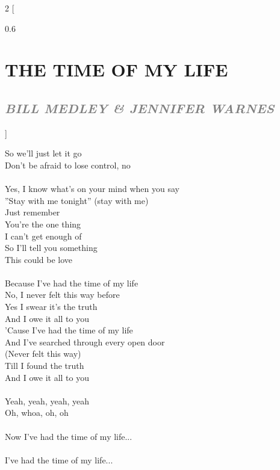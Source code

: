 \documentclass[100pt,a4paper]{report}
\newenvironment{song2}[2]
	{	
    	\begin{multicols*}{2}
		[
			\begin{spacing}{0.6}
				\section*{\LARGE\centering \MakeUppercase{\textbf{{#1}}}}
				\subsection*{\Large\centering \textit{\textcolor{gray}{\MakeUppercase{{#2}}}}}
			\end{spacing}
		]
		\Large
	}
	{
	\end{multicols*}
	\newpage
    }
\begin{document}
\begin{song2}{the time of my life}{Bill Medley \& Jennifer Warnes}
So we'll just let it go\\
Don't be afraid to lose control, no\\
\\
Yes, I know what's on your mind when you say\\
''Stay with me tonight'' (stay with me)\\
Just remember\\
You're the one thing\\
I can't get enough of\\
So I'll tell you something\\
This could be love\\
\\
Because I've had the time of my life\\
No, I never felt this way before\\
Yes I swear it's the truth\\
And I owe it all to you\\
'Cause I've had the time of my life\\
And I've searched through every open door\\
(Never felt this way)\\
Till I found the truth\\
And I owe it all to you\\
\\
Yeah, yeah, yeah, yeah\\
Oh, whoa, oh, oh\\
\\
Now I've had the time of my life...\\
\\
I've had the time of my life...
\end{song2}
\end{document}
